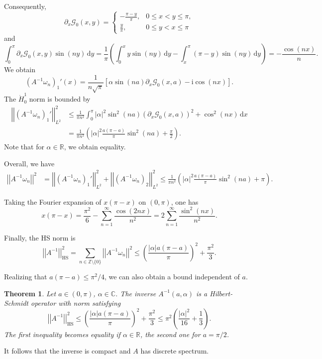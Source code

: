 \documentclass[11pt, a4paper,reqno]{amsart}
\theoremstyle{plain}
\newtheorem{theorem}{{Theorem}}[section]
\theoremstyle{definition}
\theoremstyle{remark}
\newcommand{\dd}{\,\textrm{d}}
\newcommand{\norm}[1]{\left|\left|#1\right|\right|}
\newcommand{\abs}[1]{\left\vert #1\right\vert}
\renewcommand{\leq}{\leqslant}	\renewcommand{\geq}{\geqslant}
\newcommand{\1}{\mathds 1}
\begin{document}
Consequently,
\[
\partial_x\mathcal G_0(x,y) = \begin{cases}
    -\frac{\pi-y}{\pi}, & 0 \leq x < y \leq \pi, \\
    \frac{y}{\pi}, & 0 \leq y < x \leq \pi
\end{cases}
\]
and
\[
\int_0^\pi \partial_x\mathcal G_0(x,y)\sin(ny) \dd y = \frac{1}{\pi}\left(\int_0^x y\sin(ny) \dd y -\int_x^\pi (\pi-y)\sin(ny)\dd y \right) = -\frac{\cos(nx)}{n}.
\]
We obtain
\[
\left(A^{-1}\omega_n\right)_1'(x) = \frac{1}{n\sqrt{\pi}}\left[\alpha\sin(na)\partial_x \mathcal G_0(x,a) - \mathrm{i}\cos(nx)\right].
\]
The $\dot H_0^1$ norm is bounded by
\begin{align*}
\norm{\left(A^{-1}\omega_n\right)_1'}^2_{L^2} &\leq \frac{1}{\pi n^2}\int_0^\pi |\alpha|^2\sin^2(na)(\partial_x \mathcal G_0(x,a))^2 + \cos^2(nx) \dd x\\
&= \frac{1}{\pi n^2} \left(\abs{\alpha}^2\frac{a(\pi-a)}{\pi}\sin^2(na) + \frac{\pi}{2}\right).
\end{align*}
Note that for $\alpha \in \mathbb R$, we obtain equality.

Overall, we have
\begin{align*}
\norm{A^{-1}\omega_n}^2 &= \norm{(A^{-1}\omega_n)_1'}^2_{L^2} + \norm{(A^{-1}\omega_n)_2}^2_{L^2} \leq \frac{1}{\pi n^2}\left(\abs{\alpha}^2\frac{a(\pi-a)}{\pi}\sin^2(na) + \pi\right)
.
\end{align*}

Taking the Fourier expansion of $x(\pi-x)$ on $(0, \pi)$, one has
\[
x(\pi-x) = \frac{\pi^2}{6} - \sum_{n=1}^\infty\frac{\cos(2nx)}{n^2} = 2\sum_{n=1}^\infty \frac{\sin^2(nx)}{n^2}.
\]

Finally, the HS norm is
\begin{equation*}
\norm{A^{-1}}_{\text{HS}}^2 = \sum_{n\in\mathbb Z \setminus\{0\}}\norm{A^{-1}\omega_n}^2 \leq \left(\frac{|\alpha|a(\pi-a)}{\pi}\right)^2 + \frac{\pi^2}{3}.
\end{equation*}

Realizing that $a(\pi-a)\leq \pi^2/4$, we can also obtain a bound independent of $a$.
\begin{theorem}\label{T: HS norm}
    Let $a \in (0, \pi)$, $\alpha \in \mathbb C$. The inverse $A^{-1}(a, \alpha)$ is a Hilbert-Schmidt operator with norm satisfying
\begin{equation}
    \norm{A^{-1}}_{\text{HS}}^2 \leq \left(\frac{|\alpha|a(\pi-a)}{\pi}\right)^2 + \frac{\pi^2}{3} \leq \pi^2\left(\frac{|\alpha|^2}{16} + \frac{1}{3}\right).
    \label{HSnorm}
\end{equation}
The first inequality becomes equality if $\alpha \in \mathbb R$, the second one for $a=\pi/2$.
\end{theorem}
It follows that the inverse is compact and $A$ has discrete spectrum.
\end{document}
